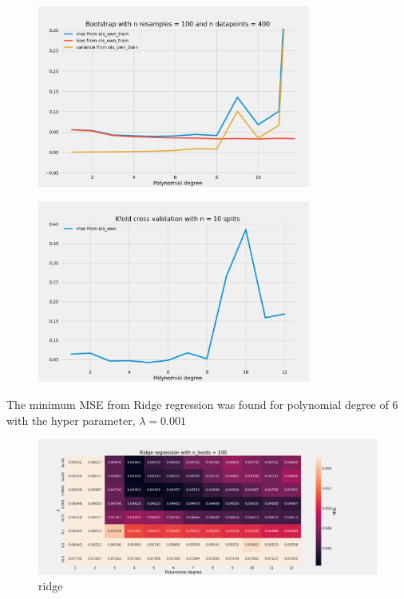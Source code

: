 \begin{figure}[H]
    \centering
    \includegraphics[width=0.8\textwidth]{Figures/c_bootstrap_ols_n_data_400_train_data.png}
\end{figure}


\begin{figure}[H]
    \centering
    \includegraphics[width=0.8\textwidth]{Figures/d_kfold_ols_n_10.png}
\end{figure}


The minimum MSE from Ridge regression was found for polynomial degree of 6 with
the hyper parameter, $\lambda = 0.001$
\begin{figure}[H]
    \centering
    \caption{ridge}  
    \label{fig:e_ridge} 
    \includegraphics[width=1\textwidth]{Figures/e_ridge_n_boots_100.png}
\end{figure}

